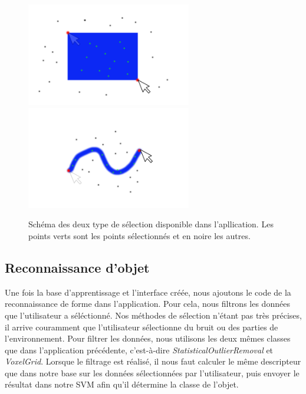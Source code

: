 \begin{figure}[!h]
  \begin{center}
    \includegraphics[height=4.5cm]{image/selection1.png}
    \includegraphics[height=4.5cm]{image/selection2.png}
    \caption{Schéma des deux type de sélection disponible dans l'apllication. Les points verts
    sont les points sélectionnés et en noire les autres.}
  \end{center}
\end{figure}

\subsection{Reconnaissance d'objet}
Une fois la base d'apprentissage et l'interface créée, nous ajoutons le code de la reconnaissance de forme dans l'application.
Pour cela, nous filtrons les données que l'utilisateur a séléctionné. Nos méthodes de sélection n'étant pas très précises, il arrive
couramment que l'utilisateur sélectionne du bruit ou des parties de l'environnement. Pour filtrer les données, nous utilisons
les deux mêmes classes que dans l'application précédente, c'est-à-dire \textit{StatisticalOutlierRemoval} et \textit{VoxelGrid}.
Lorsque le filtrage est réalisé, il nous faut calculer le même descripteur que dans notre base sur les données sélectionnées par 
l'utilisateur, puis envoyer le résultat dans notre SVM afin qu'il détermine la classe de l'objet.

